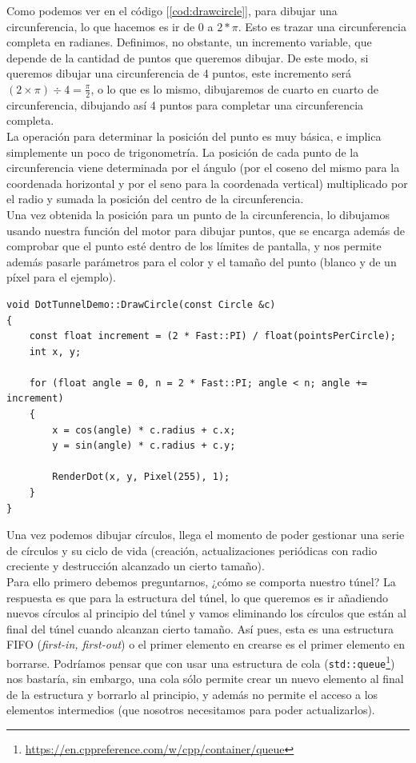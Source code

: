 Como podemos ver en el código [\ref{cod:drawcircle}], para dibujar una circunferencia, lo que hacemos es ir de \(0\) a \(2 * \pi\). Esto es trazar una circunferencia completa en radianes. Definimos, no obstante, un incremento variable, que depende de la cantidad de puntos que queremos dibujar. De este modo, si queremos dibujar una circunferencia de 4 puntos, este incremento será \((2 \times \pi) \div 4 = \frac{\pi}{2}\), o lo que es lo mismo, dibujaremos de cuarto en cuarto de circunferencia, dibujando así 4 puntos para completar una circunferencia completa.\\

La operación para determinar la posición del punto es muy básica, e implica simplemente un poco de trigonometría. La posición de cada punto de la circunferencia viene determinada por el ángulo (por el coseno del mismo para la coordenada horizontal y por el seno para la coordenada vertical) multiplicado por el radio y sumada la posición del centro de la circunferencia.\\

Una vez obtenida la posición para un punto de la circunferencia, lo dibujamos usando nuestra función del motor para dibujar puntos, que se encarga además de comprobar que el punto esté dentro de los límites de pantalla, y nos permite además pasarle parámetros para el color y el tamaño del punto (blanco y de un píxel para el ejemplo).\\

\begin{lstlisting}[style=C-color, caption={Algoritmo básico de dibujado de circunferencias},label=cod:drawcircle]
void DotTunnelDemo::DrawCircle(const Circle &c)
{
    const float increment = (2 * Fast::PI) / float(pointsPerCircle);
    int x, y;

    for (float angle = 0, n = 2 * Fast::PI; angle < n; angle += increment)
    {
        x = cos(angle) * c.radius + c.x;
        y = sin(angle) * c.radius + c.y;
        
        RenderDot(x, y, Pixel(255), 1);
    }
}
\end{lstlisting}

Una vez podemos dibujar círculos, llega el momento de poder gestionar una serie de círculos y su ciclo de vida (creación, actualizaciones periódicas con radio creciente y destrucción alcanzado un cierto tamaño).\\

Para ello primero debemos preguntarnos, ¿cómo se comporta nuestro túnel? La respuesta es que para la estructura del túnel, lo que queremos es ir añadiendo nuevos círculos al principio del túnel y vamos eliminando los círculos que están al final del túnel cuando alcanzan cierto tamaño. Así pues, esta es una estructura FIFO (\emph{first-in, first-out}) o el primer elemento en crearse es el primer elemento en borrarse. Podríamos pensar que con usar una estructura de cola (\lstinline{std::queue}\footnote{\url{https://en.cppreference.com/w/cpp/container/queue}}) nos bastaría, sin embargo, una cola sólo permite crear un nuevo elemento al final de la estructura y borrarlo al principio, y además no permite el acceso a los elementos intermedios (que nosotros necesitamos para poder actualizarlos).\\

